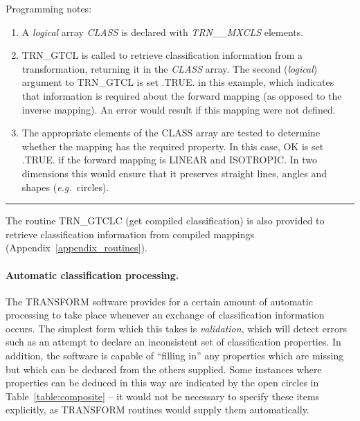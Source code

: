 \documentclass[twoside,nolof,11pt]{starlink}
\providecommand{\name}[1]{\small{#1}}
\providecommand{\fortvar}[1]{\emph{#1}}
\providecommand{\exampledone}[0]{\begin{center} \rule{6em}{0.2mm} \end{center}}
\begin{document}
Programming notes:

\begin{enumerate}

\item A \emph{logical} array \fortvar{CLASS} is declared with
\fortvar{TRN\_\_MXCLS} elements.

\item \name{TRN\_GTCL} is called to retrieve classification information from
a transformation, returning it in the \fortvar{CLASS} array.
The second (\emph{logical}) argument to \name{TRN\_GTCL} is set \name{.TRUE.}
in this example, which indicates that information is required about the
forward mapping (as opposed to the inverse mapping).
An error would result if this mapping were not defined.

\item The appropriate elements of the \name{CLASS} array are tested to
determine whether the mapping has the required property.
In this case, \name{OK} is set \name{.TRUE.} if the forward mapping is
\name{LINEAR} and \name{ISOTROPIC}.
In two dimensions this would ensure that it preserves straight lines, angles
and shapes (\emph{e.g.}\ circles).

\end{enumerate}
\exampledone

The routine \name{TRN\_GTCLC} (get compiled classification) is also provided
to retrieve classification information from compiled mappings
(Appendix~\ref{appendix_routines}).

\paragraph{Automatic classification processing.}
The \name{TRANSFORM} software provides for a certain amount of automatic
processing to take place whenever an exchange of classification information
occurs.
The simplest form which this takes is \emph{validation}, which will detect
errors such as an attempt to declare an inconsistent set of classification
properties.
In addition, the software is capable of ``filling in'' any properties which
are missing but which can be deduced from the others supplied.
Some instances where properties can be deduced in this way are indicated by
the open circles in Table~\ref{table:composite} -- it would not be
necessary to specify these items explicitly, as \name{TRANSFORM} routines
would supply them automatically.
\end{document}
